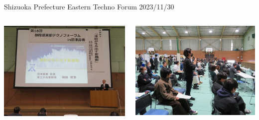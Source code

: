 \documentclass[dvipdfmx, unicode, 169]{beamer}
\begin{document}
\begin{frame}{Shizuoka Prefecture Eastern Techno Forum 2023/11/30}
  \begin{columns}[T]
    \begin{column}{0.5\linewidth}
      \centering
      \includegraphics[width=\linewidth]{img/ActiveReport/3.jpg}
    \end{column}
    \begin{column}{0.5\linewidth}
      \centering
      \includegraphics[width=\linewidth]{img/ActiveReport/4.jpg}
    \end{column}
  \end{columns}
\end{frame}
\end{document}
